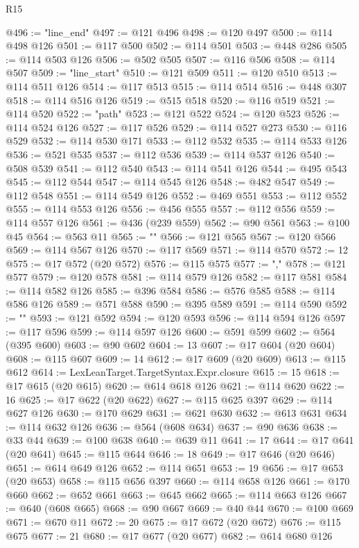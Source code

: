 \begin{lexlean}{R15}
\begin{coremodule}
@496 := "line_end"
@497 := @121 @496
@498 := @120 @497
@500 := @114 @498 @126
@501 := @117 @500
@502 := @114 @501
@503 := @448 @286
@505 := @114 @503 @126
@506 := @502 @505
@507 := @116 @506
@508 := @114 @507
@509 := "line_start"
@510 := @121 @509
@511 := @120 @510
@513 := @114 @511 @126
@514 := @117 @513
@515 := @114 @514
@516 := @448 @307
@518 := @114 @516 @126
@519 := @515 @518
@520 := @116 @519
@521 := @114 @520
@522 := "path"
@523 := @121 @522
@524 := @120 @523
@526 := @114 @524 @126
@527 := @117 @526
@529 := @114 @527 @273
@530 := @116 @529
@532 := @114 @530 @171
@533 := @112 @532
@535 := @114 @533 @126
@536 := @521 @535
@537 := @112 @536
@539 := @114 @537 @126
@540 := @508 @539
@541 := @112 @540
@543 := @114 @541 @126
@544 := @495 @543
@545 := @112 @544
@547 := @114 @545 @126
@548 := @482 @547
@549 := @112 @548
@551 := @114 @549 @126
@552 := @469 @551
@553 := @112 @552
@555 := @114 @553 @126
@556 := @456 @555
@557 := @112 @556
@559 := @114 @557 @126
@561 := @436 (@239 @559)
@562 := @90 @561
@563 := @100 @45
@564 := @563 @11
@565 := "{"
@566 := @121 @565
@567 := @120 @566
@569 := @114 @567 @126
@570 := @117 @569
@571 := @114 @570
@572 := 12
@575 := @17 @572 (@20 @572)
@576 := @115 @575
@577 := ","
@578 := @121 @577
@579 := @120 @578
@581 := @114 @579 @126
@582 := @117 @581
@584 := @114 @582 @126
@585 := @396 @584
@586 := @576 @585
@588 := @114 @586 @126
@589 := @571 @588
@590 := @395 @589
@591 := @114 @590
@592 := "}"
@593 := @121 @592
@594 := @120 @593
@596 := @114 @594 @126
@597 := @117 @596
@599 := @114 @597 @126
@600 := @591 @599
@602 := @564 (@395 @600)
@603 := @90 @602
@604 := 13
@607 := @17 @604 (@20 @604)
@608 := @115 @607
@609 := 14
@612 := @17 @609 (@20 @609)
@613 := @115 @612
@614 := LexLeanTarget.TargetSyntax.Expr.closure
@615 := 15
@618 := @17 @615 (@20 @615)
@620 := @614 @618 @126
@621 := @114 @620
@622 := 16
@625 := @17 @622 (@20 @622)
@627 := @115 @625 @397
@629 := @114 @627 @126
@630 := @170 @629
@631 := @621 @630
@632 := @613 @631
@634 := @114 @632 @126
@636 := @564 (@608 @634)
@637 := @90 @636
@638 := @33 @44
@639 := @100 @638
@640 := @639 @11
@641 := 17
@644 := @17 @641 (@20 @641)
@645 := @115 @644
@646 := 18
@649 := @17 @646 (@20 @646)
@651 := @614 @649 @126
@652 := @114 @651
@653 := 19
@656 := @17 @653 (@20 @653)
@658 := @115 @656 @397
@660 := @114 @658 @126
@661 := @170 @660
@662 := @652 @661
@663 := @645 @662
@665 := @114 @663 @126
@667 := @640 (@608 @665)
@668 := @90 @667
@669 := @40 @44
@670 := @100 @669
@671 := @670 @11
@672 := 20
@675 := @17 @672 (@20 @672)
@676 := @115 @675
@677 := 21
@680 := @17 @677 (@20 @677)
@682 := @614 @680 @126

\end{coremodule}
\end{lexlean}
